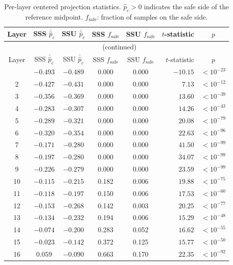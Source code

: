 \documentclass{article}
\begin{document}
\begin{longtable}{c cc cc r c}
\caption{Per-layer centered projection statistics.
         $\hat{p}_c > 0$ indicates the safe side of the reference midpoint.
         $f_{\text{safe}}$: fraction of samples on the safe side.}
\label{tab:centered_full}\\
\toprule
Layer
  & SSS $\bar{\hat{p}}_c$ & SSU $\bar{\hat{p}}_c$
  & SSS $f_{\text{safe}}$ & SSU $f_{\text{safe}}$
  & $t$-statistic & $p$ \\
\midrule
\endfirsthead
\multicolumn{7}{c}{\tablename\ \thetable{} (continued)} \\
\toprule
Layer
  & SSS $\bar{\hat{p}}_c$ & SSU $\bar{\hat{p}}_c$
  & SSS $f_{\text{safe}}$ & SSU $f_{\text{safe}}$
  & $t$-statistic & $p$ \\
\midrule
\endhead
\bottomrule
\endlastfoot
 1 & $-0.493$ & $-0.489$ & 0.000 & 0.000 & $-10.15$ & $<10^{-23}$ \\
 2 & $-0.427$ & $-0.431$ & 0.000 & 0.000 &   $7.13$ & $<10^{-12}$ \\
 3 & $-0.356$ & $-0.369$ & 0.000 & 0.000 &  $13.60$ & $<10^{-39}$ \\
 4 & $-0.283$ & $-0.307$ & 0.000 & 0.000 &  $14.26$ & $<10^{-43}$ \\
 5 & $-0.289$ & $-0.321$ & 0.000 & 0.000 &  $20.08$ & $<10^{-79}$ \\
 6 & $-0.320$ & $-0.354$ & 0.000 & 0.000 &  $22.63$ & $<10^{-96}$ \\
 7 & $-0.171$ & $-0.280$ & 0.000 & 0.000 &  $41.50$ & $<10^{-99}$ \\
 8 & $-0.197$ & $-0.280$ & 0.000 & 0.000 &  $34.07$ & $<10^{-99}$ \\
 9 & $-0.226$ & $-0.279$ & 0.000 & 0.000 &  $23.59$ & $<10^{-99}$ \\
10 & $-0.115$ & $-0.215$ & 0.182 & 0.006 &  $19.88$ & $<10^{-75}$ \\
11 & $-0.118$ & $-0.197$ & 0.150 & 0.006 &  $17.53$ & $<10^{-60}$ \\
12 & $-0.153$ & $-0.268$ & 0.142 & 0.003 &  $20.25$ & $<10^{-77}$ \\
13 & $-0.134$ & $-0.232$ & 0.194 & 0.006 &  $15.29$ & $<10^{-48}$ \\
14 & $-0.074$ & $-0.200$ & 0.283 & 0.052 &  $16.62$ & $<10^{-55}$ \\
15 & $-0.023$ & $-0.142$ & 0.372 & 0.125 &  $15.77$ & $<10^{-50}$ \\
16 &  $0.059$ & $-0.090$ & 0.663 & 0.170 &  $22.35$ & $<10^{-92}$ \\

\end{longtable}
\end{document}
